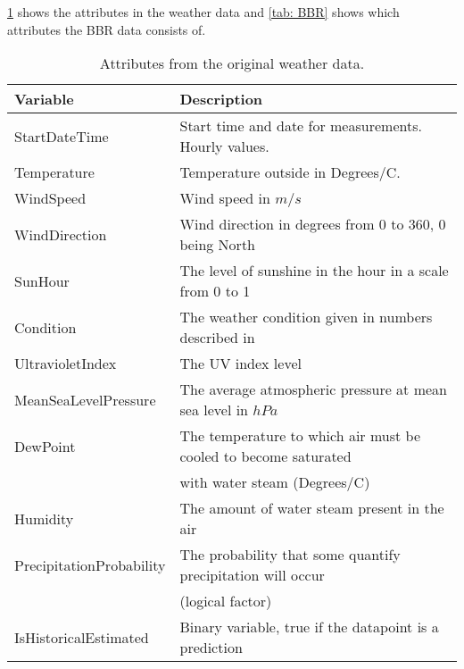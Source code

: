 \noindent \cref{tab: weatherdata} shows the attributes in the weather data and \cref{tab: BBR} shows which attributes the BBR data consists of.
\begin{table}[H]
    \centering
    \begin{tabular}{ll}
     \hline
     \textbf{Variable} & \textbf{Description} \\
    \hline
    \hline
    StartDateTime  &  Start time and date for measurements. Hourly values.\\
    Temperature  &  Temperature outside in Degrees/C. \\
    WindSpeed  & Wind speed in $m/s$\\
    WindDirection  & Wind direction in degrees from 0 to 360, 0 being North \\
    SunHour  & The level of sunshine in the hour in a scale from 0 to 1 \\
    Condition  & The weather condition given in numbers described in \cite{condition} \\
    UltravioletIndex  & The UV index level \\
    MeanSeaLevelPressure  & The average atmospheric pressure at mean sea level in $hPa$ \\
    DewPoint  &  The temperature to which air must be cooled to become saturated \\ & with water steam (Degrees/C)\\
    Humidity  & The amount of water steam present in the air \\
    PrecipitationProbability & The probability that some quantify precipitation will occur \\ & (logical factor)\\
    IsHistoricalEstimated & Binary variable, true if the datapoint is a prediction \\
    \hline
    \end{tabular}
    \caption{Attributes from the original weather data.}
    \label{tab: weatherdata}
\end{table}
